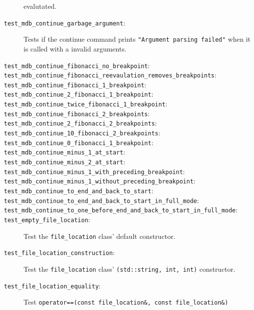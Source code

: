 \begin{description}
        evalutated.
    \item[\texttt{test\_mdb\_continue\_garbage\_argument}:]
        Tests if the continue command prints
        \texttt{"Argument parsing failed"} when it is called with a invalid
        arguments.
    \item[\texttt{test\_mdb\_continue\_fibonacci\_no\_breakpoint}:]
    \item[\texttt{test\_mdb\_continue\_fibonacci\_reevaulation\_removes\_breakpoints}:]
    \item[\texttt{test\_mdb\_continue\_fibonacci\_1\_breakpoint}:]
    \item[\texttt{test\_mdb\_continue\_2\_fibonacci\_1\_breakpoint}:]
    \item[\texttt{test\_mdb\_continue\_twice\_fibonacci\_1\_breakpoint}:]
    \item[\texttt{test\_mdb\_continue\_fibonacci\_2\_breakpoints}:]
    \item[\texttt{test\_mdb\_continue\_2\_fibonacci\_2\_breakpoints}:]
    \item[\texttt{test\_mdb\_continue\_10\_fibonacci\_2\_breakpoints}:]
    \item[\texttt{test\_mdb\_continue\_0\_fibonacci\_1\_breakpoint}:]
    \item[\texttt{test\_mdb\_continue\_minus\_1\_at\_start}:]
    \item[\texttt{test\_mdb\_continue\_minus\_2\_at\_start}:]
    \item[\texttt{test\_mdb\_continue\_minus\_1\_with\_preceding\_breakpoint}:]
    \item[\texttt{test\_mdb\_continue\_minus\_1\_without\_preceding\_breakpoint}:]
    \item[\texttt{test\_mdb\_continue\_to\_end\_and\_back\_to\_start}:]
    \item[\texttt{test\_mdb\_continue\_to\_end\_and\_back\_to\_start\_in\_full\_mode}:]
    \item[\texttt{test\_mdb\_continue\_to\_one\_before\_end\_and\_back\_to\_start\_in\_full\_mode}:]
    \item[\texttt{test\_empty\_file\_location}:]
        Test the \texttt{file\_location} class' default constructor.
    \item[\texttt{test\_file\_location\_construction}:]
        Test the \texttt{file\_location} class'
        \texttt{(std::string, int, int)} constructor.
    \item[\texttt{test\_file\_location\_equality}:]
        Test \texttt{operator==(const file\_location\&, const file\_location\&)}

\end{description}

